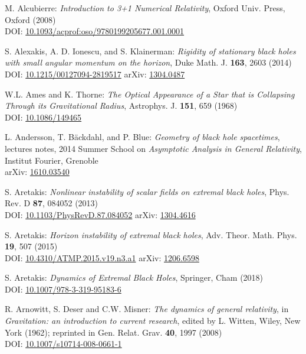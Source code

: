 \begin{thebibliography}{123}
M. Alcubierre:
{\em Introduction to 3+1 Numerical Relativity},
Oxford Univ. Press, Oxford (2008)\\
DOI: \href{https://doi.org/10.1093/acprof:oso/9780199205677.001.0001}{10.1093/acprof:oso/9780199205677.001.0001}

S. Alexakis, A. D. Ionescu, and S. Klainerman: {\em Rigidity of stationary black holes with small angular momentum on the horizon},
Duke Math. J. {\bf 163}, 2603 (2014)\\
DOI: \href{https://doi.org/10.1215/00127094-2819517}{10.1215/00127094-2819517}\hfill
arXiv: \href{https://arxiv.org/abs/1304.0487}{1304.0487}

W.L. Ames and K. Thorne:
{\em The Optical Appearance of a Star that is Collapsing Through its Gravitational Radius},
Astrophys. J. {\bf 151}, 659 (1968)\\
DOI: \href{https://doi.org/10.1086/149465}{10.1086/149465}

L. Andersson, T. Bäckdahl, and P. Blue:
{\em Geometry of black hole spacetimes},
lectures notes,
2014 Summer School on {\em Asymptotic Analysis in General Relativity},
Institut Fourier, Grenoble\\
arXiv: \href{https://arxiv.org/abs/1610.03540}{1610.03540}

S. Aretakis:
{\em Nonlinear instability of scalar fields on extremal black holes},
Phys. Rev. D {\bf 87}, 084052 (2013)\\
DOI: \href{https://doi.org/10.1103/PhysRevD.87.084052}{10.1103/PhysRevD.87.084052}\hfill
arXiv: \href{https://arxiv.org/abs/1304.4616}{1304.4616}

S. Aretakis:
{\em Horizon instability of extremal black holes},
Adv. Theor. Math. Phys. {\bf 19}, 507 (2015)\\
DOI: \href{https://doi.org/10.4310/ATMP.2015.v19.n3.a1}{10.4310/ATMP.2015.v19.n3.a1}\hfill
arXiv: \href{https://arxiv.org/abs/1206.6598}{1206.6598}

S. Aretakis:
{\em Dynamics of Extremal Black Holes},
Springer, Cham (2018)\\
DOI: \href{https://doi.org/10.1007/978-3-319-95183-6}{10.1007/978-3-319-95183-6}

R. Arnowitt, S. Deser and C.W. Misner:
{\em The dynamics of general relativity},
in {\em Gravitation: an introduction to current research},
edited by L. Witten,
Wiley, New York (1962); reprinted in
Gen. Relat. Grav. {\bf 40}, 1997 (2008)\\
DOI: \href{https://doi.org/10.1007/s10714-008-0661-1}{10.1007/s10714-008-0661-1}


\end{thebibliography}
